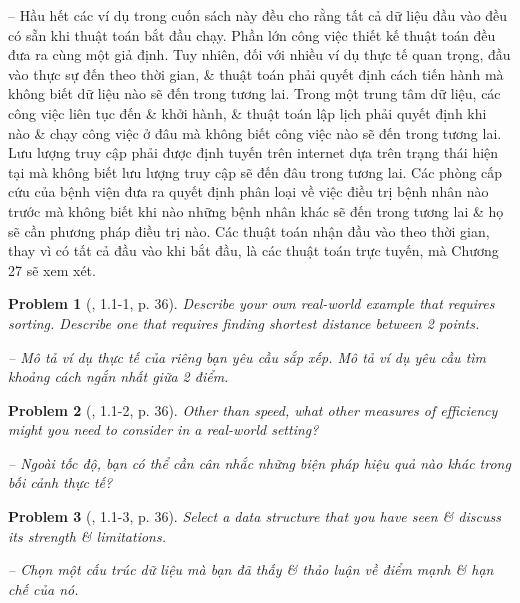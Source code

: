 \documentclass{article}
\newtheorem{problem}{Problem}
\begin{document}
\begin{itemize}
\begin{itemize}
\begin{itemize}
            -- Hầu hết các ví dụ trong cuốn sách này đều cho rằng tất cả dữ liệu đầu vào đều có sẵn khi thuật toán bắt đầu chạy. Phần lớn công việc thiết kế thuật toán đều đưa ra cùng một giả định. Tuy nhiên, đối với nhiều ví dụ thực tế quan trọng, đầu vào thực sự đến theo thời gian, \& thuật toán phải quyết định cách tiến hành mà không biết dữ liệu nào sẽ đến trong tương lai. Trong một trung tâm dữ liệu, các công việc liên tục đến \& khởi hành, \& thuật toán lập lịch phải quyết định khi nào \& chạy công việc ở đâu mà không biết công việc nào sẽ đến trong tương lai. Lưu lượng truy cập phải được định tuyến trên internet dựa trên trạng thái hiện tại mà không biết lưu lượng truy cập sẽ đến đâu trong tương lai. Các phòng cấp cứu của bệnh viện đưa ra quyết định phân loại về việc điều trị bệnh nhân nào trước mà không biết khi nào những bệnh nhân khác sẽ đến trong tương lai \& họ sẽ cần phương pháp điều trị nào. Các thuật toán nhận đầu vào theo thời gian, thay vì có tất cả đầu vào khi bắt đầu, là các thuật toán trực tuyến, mà Chương 27 sẽ xem xét.
            
            \begin{problem}[\cite{Cormen_Leiserson_Rivest_Stein_algorithm}, 1.1-1, p. 36]
                Describe your own real-world example that requires sorting. Describe one that requires finding shortest distance between 2 points.
                
                -- Mô tả ví dụ thực tế của riêng bạn yêu cầu sắp xếp. Mô tả ví dụ yêu cầu tìm khoảng cách ngắn nhất giữa 2 điểm.
            \end{problem}
            
            \begin{problem}[\cite{Cormen_Leiserson_Rivest_Stein_algorithm}, 1.1-2, p. 36]
                Other than speed, what other measures of efficiency might you need to consider in a real-world setting?
                
                -- Ngoài tốc độ, bạn có thể cần cân nhắc những biện pháp hiệu quả nào khác trong bối cảnh thực tế?
            \end{problem}
            
            \begin{problem}[\cite{Cormen_Leiserson_Rivest_Stein_algorithm}, 1.1-3, p. 36]
                Select a data structure that you have seen \& discuss its strength \& limitations.
                
                -- Chọn một cấu trúc dữ liệu mà bạn đã thấy \& thảo luận về điểm mạnh \& hạn chế của nó.
            \end{problem}
            

\end{itemize}
\end{itemize}
\end{itemize}
\end{document}
